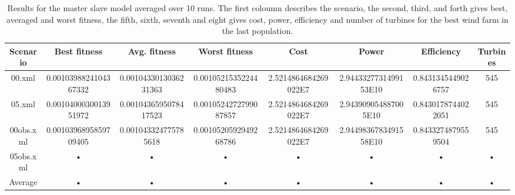 \begin{table}[h!]
\centering
\caption{Results for the master slave model averaged over 10 runs. The first coloumn describes the scenario, the second, third, and forth gives best, averaged and worst fitness, the fifth, sixth, seventh and eight gives cost, power, efficiency and number of turbines for the best wind farm in the last population.}
\label{table:results master slave model}
\tiny
\begin{tabular}{c|c|c|c|c|c|c|c}
Scenario & Best fitness & Avg. fitness & Worst fitness & Cost & Power & Efficiency & Turbines \\ 
\hline 
00.xml      & 0.0010398824104367332 & 0.0010433013036231363 & 0.0010521535224480483 & 2.5214864684269022E7 & 2.9443327731499153E10 & 0.8431345449026757 & 545 \\ 

05.xml       & 0.0010400030013951972 & 0.0010436595078417523 & 0.0010524272799087857 & 2.5214864684269022E7 & 2.943909054887005E10 & 0.8430178744022051 & 545 \\ 

00obs.xml & 0.0010396895859709405 & 0.001043324775785618 & 0.0010520592949268786 & 2.5214864684269022E7 & 2.9449836783491558E10 & 0.8433274879559504 & 545 \\ 

05obs.xml & • & • & • & • & • & • & • \\ 
\hline
Average    & • & • & • & • & • & • & • \\ 
 
\end{tabular} 
\end{table}


